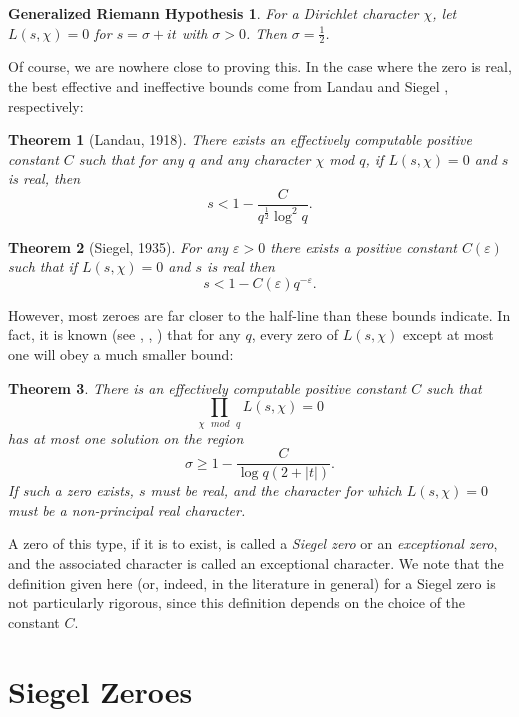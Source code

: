 \documentclass{amsart}
\newtheorem{theorem}{Theorem}[section]
\newtheorem*{GRH}{Generalized Riemann Hypothesis}
\begin{document}
\begin{GRH}
For a Dirichlet character $\chi$, let $L(s,\chi)=0$ for $s=\sigma+it$ with $\sigma>0$.  Then $\sigma=\frac 12$.
\end{GRH}

Of course, we are nowhere close to proving this.  In the case where the zero is real, the best effective and ineffective bounds come from Landau \cite{La} and Siegel \cite{Si}, respectively:
\begin{theorem}[Landau, 1918]
There exists an effectively computable positive constant $C$ such that for any $q$ and any character $\chi$ mod $q$, if $L(s,\chi)=0$ and $s$ is real, then
$$s<1-\frac{C}{q^\frac 12 \log^2 q}.$$
\end{theorem}
\begin{theorem}[Siegel, 1935]
For any $\varepsilon>0$ there exists a positive constant $C(\varepsilon)$ such that if $L(s,\chi)=0$ and $s$ is real then
$$s<1-C(\varepsilon)q^{-\varepsilon}.$$
\end{theorem}
However, most zeroes are far closer to the half-line than these bounds indicate.  In fact, it is known (see \cite{Gr}, \cite{La}, \cite{Ti}) that for any $q$, every zero of $L(s,\chi)$ except at most one will obey a much smaller bound:
\begin{theorem}
There is an effectively computable positive constant $C$ such that $$\prod_{\chi\mbox{ }mod\mbox{ }q}L(s,\chi)=0$$
has at most one solution on the region $$\sigma\geq 1-\frac{C}{\log q(2+|t|)}.$$
If such a zero exists, $s$ must be real, and the character for which $L(s,\chi)=0$ must be a non-principal real character.
\end{theorem}


A zero of this type, if it is to exist, is called a \textit{Siegel zero} or an \textit{exceptional zero}, and the associated character is called an exceptional character. We note that the definition given here (or, indeed, in the literature in general) for a Siegel zero is not particularly rigorous, since this definition depends on the choice of the constant $C$.


\section{Siegel Zeroes}\label{Siegelsection}
\end{document}
